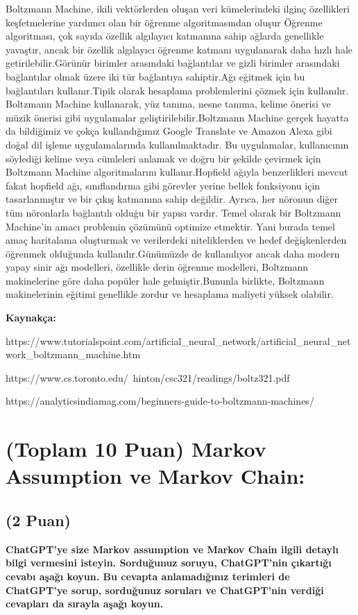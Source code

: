 \documentclass[11pt]{article}
\begin{document}
Boltzmann Machine, ikili vektörlerden oluşan veri kümelerindeki ilginç özellikleri keşfetmelerine yardımcı olan bir öğrenme algoritmasından oluşur
 Öğrenme algoritması, çok sayıda özellik algılayıcı katmanına sahip ağlarda genellikle yavaştır, ancak bir özellik algılayıcı öğrenme katmanı uygulanarak daha hızlı hale getirilebilir.Görünür birimler arasındaki bağlantılar ve gizli birimler arasındaki bağlantılar olmak üzere iki tür bağlantıya sahiptir.Ağı eğitmek için bu bağlantıları kullanır.Tipik olarak hesaplama problemlerini çözmek için kullanılır. Boltzmann Machine kullanarak, yüz tanıma, nesne tanıma, kelime önerisi ve müzik önerisi gibi uygulamalar geliştirilebilir.Boltzmann Machine gerçek hayatta da bildiğimiz ve çokça kullandığımız Google Translate ve Amazon Alexa gibi doğal dil işleme uygulamalarında kullanılmaktadır. Bu uygulamalar, kullanıcının söylediği kelime veya cümleleri anlamak ve doğru bir şekilde çevirmek için Boltzmann Machine algoritmalarını kullanır.Hopfield ağıyla benzerlikleri mevcut fakat hopfield ağı, sınıflandırma gibi görevler yerine bellek fonksiyonu için tasarlanmıştır ve bir çıkış katmanına sahip değildir. Ayrıca, her nöronun diğer tüm nöronlarla bağlantılı olduğu bir yapısı vardır. Temel olarak bir Boltzmann Machine'in amacı problemin çözümünü optimize etmektir. Yani burada temel amaç haritalama oluşturmak ve verilerdeki niteliklerden ve hedef değişkenlerden öğrenmek olduğunda kullanılır.Günümüzde de kullanılıyor ancak daha modern yapay sinir ağı modelleri, özellikle derin öğrenme modelleri, Boltzmann makinelerine göre daha popüler hale gelmiştir.Bununla birlikte, Boltzmann makinelerinin eğitimi genellikle zordur ve hesaplama maliyeti yüksek olabilir.

 \textbf{Kaynakça:}
 
 https://www.tutorialspoint.com/artificial_neural_network/artificial_neural_network_boltzmann_machine.htm

https://www.cs.toronto.edu/~hinton/csc321/readings/boltz321.pdf

 https://analyticsindiamag.com/beginners-guide-to-boltzmann-machines/

 
\section{(Toplam 10 Puan) Markov Assumption ve Markov Chain:}

\subsection{(2 Puan)} \textbf{ChatGPT’ye size Markov assumption ve Markov Chain ilgili detaylı bilgi vermesini isteyin. Sorduğunuz soruyu, ChatGPT'nin çıkartığı cevabı aşağı koyun. Bu cevapta anlamadığınız terimleri de ChatGPT’ye sorup, sorduğunuz soruları ve ChatGPT’nin verdiği cevapları da sırayla aşağı koyun.}
\end{document}
